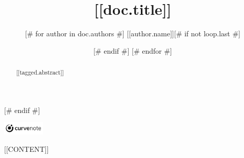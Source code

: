 \documentclass{article}
\title{[[doc.title]]}
\author{
[# for author in doc.authors #]
[[author.name]][# if not loop.last #] \and [# endif #]
[# endfor #]
}
\date{\displaydate{articleDate}}
\newcommand{\logo}{
  \href{[[doc.oxalink]]}{\includegraphics[width=2cm]{curvenote.png}}
}
\begin{document}
\begin{abstract}[[tagged.abstract]]\end{abstract}[# endif #]
\begin{center}\logo\end{center}
[[CONTENT]]

\end{document}
